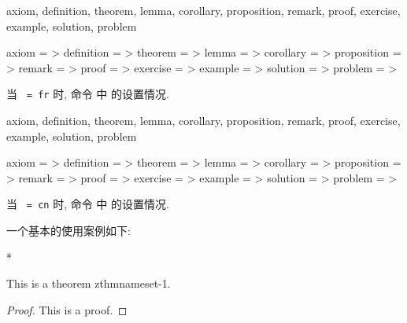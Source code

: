 \begin{keyval}[parent=..]{
    axiom, definition, theorem, lemma, corollary, proposition, remark,
    proof, exercise, example, solution, problem
  }
  \begin{syntax}
    axiom       = >
    definition  = >
    theorem     = >
    lemma       = >
    corollary   = >
    proposition = >
    remark      = >
    proof       = >
    exercise    = >
    example     = >
    solution    = >
    problem     = >
  \end{syntax}
  当 \texttt{ = fr} 时, 命令  中  的设置情况.
\end{keyval}


\begin{keyval}[parent=..]{
    axiom, definition, theorem, lemma, corollary, proposition, remark,
    proof, exercise, example, solution, problem
  }
  \begin{syntax}
    axiom       = >
    definition  = >
    theorem     = >
    lemma       = >
    corollary   = >
    proposition = >
    remark      = >
    proof       = >
    exercise    = >
    example     = >
    solution    = >
    problem     = >
  \end{syntax}
  当 \texttt{ = cn} 时, 命令  中  的设置情况.
\end{keyval}
一个基本的使用案例如下\zchcmd:
\begin{DocExample}*
  \begin{theorem}[zthmnameset-1]
    This is a theorem zthmnameset-1.
  \end{theorem}
  \begin{proof}
    This is a proof.
  \end{proof}
\end{DocExample}


